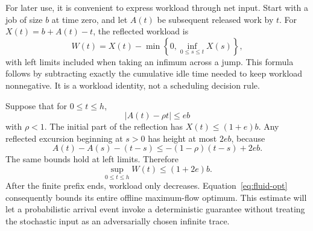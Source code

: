 For later use, it is convenient to express workload through net input. Start with a job of size $b$ at time zero, and let $A(t)$ be subsequent released work by $t$. For $X(t)=b+A(t)-t$, the reflected workload is
\begin{equation}\label{eq:reflection}
 W(t)=X(t)-\min\left\{0,\inf_{0\leq s\leq t}X(s)\right\},
\end{equation}
with left limits included when taking an infimum across a jump. This formula follows by subtracting exactly the cumulative idle time needed to keep workload nonnegative. It is a workload identity, not a scheduling decision rule.

Suppose that for $0\leq t\leq h$,
\begin{equation}\label{eq:fluid-error}
 |A(t)-\rho t|\leq e b
\end{equation}
with $\rho<1$. The initial part of the reflection has $X(t)\leq(1+e)b$. Any reflected excursion beginning at $s>0$ has height at most $2eb$, because
\[
 A(t)-A(s)-(t-s)\leq-(1-\rho)(t-s)+2eb.
\]
The same bounds hold at left limits. Therefore
\begin{equation}\label{eq:fluid-opt}
 \sup_{0\leq t\leq h}W(t)\leq(1+2e)b.
\end{equation}
After the finite prefix ends, workload only decreases. Equation~\eqref{eq:fluid-opt} consequently bounds its entire offline maximum-flow optimum. This estimate will let a probabilistic arrival event invoke a deterministic guarantee without treating the stochastic input as an adversarially chosen infinite trace.
